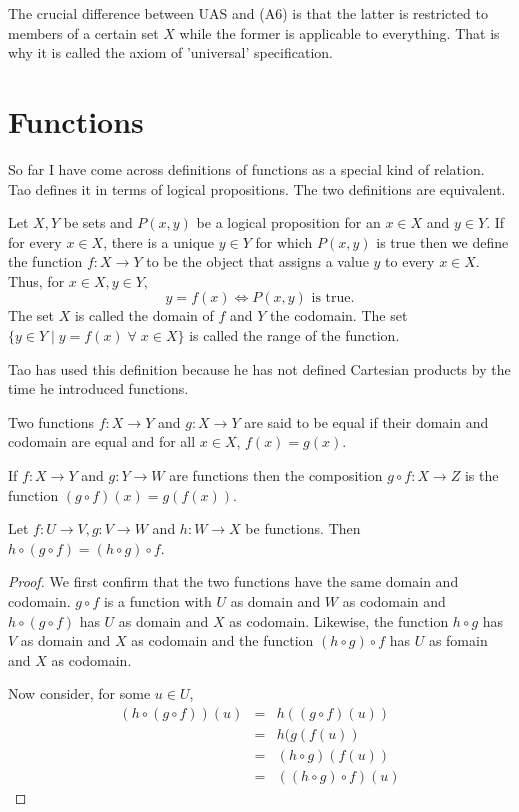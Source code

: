 The crucial difference between UAS and (A6) is that the latter is 
restricted to members of a certain set $X$ while the former is applicable 
to everything. That is why it is called the axiom of 'universal' 
specification.

\section{Functions}\label{c2s3}
So far I have come across definitions of functions as a special kind of
relation. Tao \cite{tao2014a1} defines it in terms of logical propositions.
The two definitions are equivalent.
\begin{defn}\label{c2s3d1}
Let $X, Y$ be sets and $P(x, y)$ be a logical proposition for an $x \in X$
and $y \in Y$. If for every $x \in X$, there is a unique $y \in Y$ for 
which $P(x, y)$ is true then we define the function $f: X \rightarrow Y$ 
to be the object that assigns a value $y$ to every $x \in X$. Thus, for $x 
\in X, y \in Y$,
\[
y = f(x) \Leftrightarrow P(x, y) \text{ is true.}
\]
The set $X$ is called the domain of $f$ and $Y$ the codomain. The set $\{y
\in Y \;|\; y = f(x) \;\forall\; x \in X\}$ is called the range of the 
function.
\end{defn}

Tao has used this definition because he has not defined Cartesian products
by the time he introduced functions.

\begin{defn}\label{c2s3d2}
Two functions $f: X \rightarrow Y$ and $g: X \rightarrow Y$ are said to be
equal if their domain and codomain are equal and for all $x \in X$, $f(x) 
= g(x)$.
\end{defn}

\begin{defn}\label{c2s3d3}
If $f: X \rightarrow Y$ and $g: Y \rightarrow W$ are functions then the
composition $g \circ f: X \rightarrow Z$ is the function $(g \circ f)(x)
= g(f(x))$.
\end{defn}

\begin{lem}\label{c2s3p1}
Let $f: U \rightarrow V, g: V \rightarrow W$ and $h: W \rightarrow X$ be
functions. Then $h \circ (g \circ f) = (h \circ g) \circ f$.
\end{lem}
\begin{proof}
We first confirm that the two functions have the same domain and codomain. 
$g \circ f$ is a function with $U$ as domain and $W$ as codomain and $h 
\circ (g \circ f)$ has $U$ as domain and $X$ as codomain. Likewise, the 
function $h \circ g$ has $V$ as domain and $X$ as codomain and the function
$(h \circ g) \circ f$ has $U$ as fomain and $X$ as codomain. 

Now consider, for some $u \in U$,
\begin{eqnarray*}
(h \circ (g \circ f))(u) &=& h((g \circ f)(u)) \\
 &=& h(g(f(u)) \\
 &=& (h \circ g)(f(u)) \\
 &=& ((h \circ g) \circ f)(u)
\end{eqnarray*}
\end{proof}

